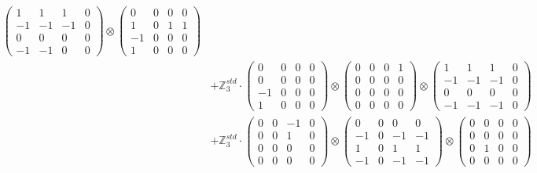 \documentclass{article}
\begin{document}
{\begin{align}
            \begin{pmatrix} 1 & 1 & 1 & 0 \\ -1 & -1 & -1 & 0 \\ 0 & 0 & 0 & 0 \\ -1 & -1 & 0 & 0 \end{pmatrix} \otimes 
            \begin{pmatrix} 0 & 0 & 0 & 0 \\ 1 & 0 & 1 & 1 \\ -1 & 0 & 0 & 0 \\ 1 & 0 & 0 & 0 \end{pmatrix} \\ 
        &+ \label{Rs16-Rc11-Solution-11-c20} \mathbb{Z}_3^{std} \cdot 
            \begin{pmatrix} 0 & 0 & 0 & 0 \\ 0 & 0 & 0 & 0 \\ -1 & 0 & 0 & 0 \\ 1 & 0 & 0 & 0 \end{pmatrix} \otimes 
            \begin{pmatrix} 0 & 0 & 0 & 1 \\ 0 & 0 & 0 & 0 \\ 0 & 0 & 0 & 0 \\ 0 & 0 & 0 & 0 \end{pmatrix} \otimes 
            \begin{pmatrix} 1 & 1 & 1 & 0 \\ -1 & -1 & -1 & 0 \\ 0 & 0 & 0 & 0 \\ -1 & -1 & -1 & 0 \end{pmatrix} \\ 
        &+ \label{Rs16-Rc11-Solution-11-c21} \mathbb{Z}_3^{std} \cdot 
            \begin{pmatrix} 0 & 0 & -1 & 0 \\ 0 & 0 & 1 & 0 \\ 0 & 0 & 0 & 0 \\ 0 & 0 & 0 & 0 \end{pmatrix} \otimes 
            \begin{pmatrix} 0 & 0 & 0 & 0 \\ -1 & 0 & -1 & -1 \\ 1 & 0 & 1 & 1 \\ -1 & 0 & -1 & -1 \end{pmatrix} \otimes 
            \begin{pmatrix} 0 & 0 & 0 & 0 \\ 0 & 0 & 0 & 0 \\ 0 & 1 & 0 & 0 \\ 0 & 0 & 0 & 0 \end{pmatrix} \\ 

\end{align}}
\end{document}

